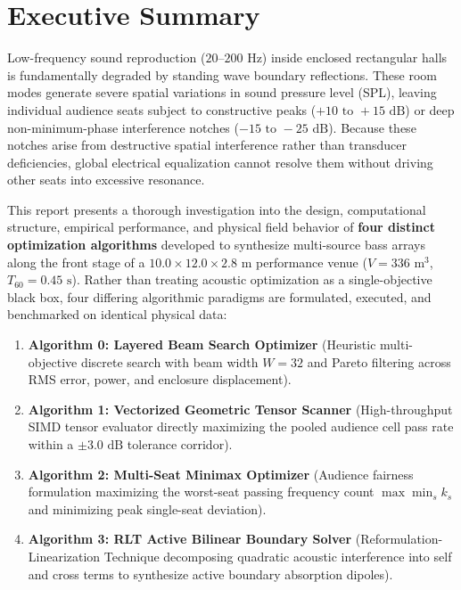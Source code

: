\documentclass[11pt,a4paper,titlepage]{article}
\begin{document}
\section*{Executive Summary}

Low-frequency sound reproduction ($20\text{--}200\text{ Hz}$) inside enclosed rectangular halls is fundamentally degraded by standing wave boundary reflections. These room modes generate severe spatial variations in sound pressure level (SPL), leaving individual audience seats subject to constructive peaks ($+10\text{ to }+15\text{ dB}$) or deep non-minimum-phase interference notches ($-15\text{ to }-25\text{ dB}$). Because these notches arise from destructive spatial interference rather than transducer deficiencies, global electrical equalization cannot resolve them without driving other seats into excessive resonance.

This report presents a thorough investigation into the design, computational structure, empirical performance, and physical field behavior of \textbf{four distinct optimization algorithms} developed to synthesize multi-source bass arrays along the front stage of a $10.0 \times 12.0 \times 2.8\text{ m}$ performance venue ($V = 336\text{ m}^3$, $T_{60} = 0.45\text{ s}$). Rather than treating acoustic optimization as a single-objective black box, four differing algorithmic paradigms are formulated, executed, and benchmarked on identical physical data:
\begin{enumerate}
    \item \textbf{Algorithm 0: Layered Beam Search Optimizer} (Heuristic multi-objective discrete search with beam width $W=32$ and Pareto filtering across RMS error, power, and enclosure displacement).
    \item \textbf{Algorithm 1: Vectorized Geometric Tensor Scanner} (High-throughput SIMD tensor evaluator directly maximizing the pooled audience cell pass rate within a $\pm 3.0\text{ dB}$ tolerance corridor).
    \item \textbf{Algorithm 2: Multi-Seat Minimax Optimizer} (Audience fairness formulation maximizing the worst-seat passing frequency count $\max \min_s k_s$ and minimizing peak single-seat deviation).
    \item \textbf{Algorithm 3: RLT Active Bilinear Boundary Solver} (Reformulation-Linearization Technique decomposing quadratic acoustic interference into self and cross terms to synthesize active boundary absorption dipoles).
\end{enumerate}
\end{document}
